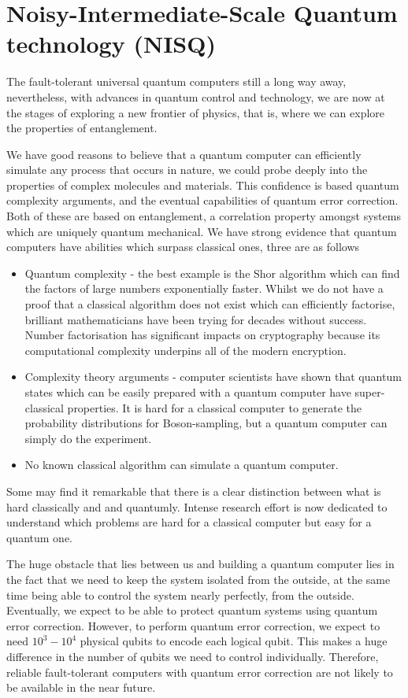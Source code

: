 \section{Noisy-Intermediate-Scale Quantum technology (NISQ)}

The fault-tolerant universal quantum computers still a long way away, nevertheless, 
with advances in quantum control and technology,
we are now at the stages of exploring a new frontier of physics, that is, where we can
explore the properties of entanglement.

We have good reasons to believe that a quantum computer can efficiently simulate any process that occurs in nature, we could probe deeply into the properties of complex molecules and materials. This confidence is based quantum complexity arguments, and the eventual capabilities of quantum error correction. Both of these are based on entanglement, a correlation property amongst systems which are uniquely quantum mechanical. We have strong evidence that quantum computers have abilities which surpass classical ones, three are as follows
\begin{itemize}
\item Quantum complexity - the best example is the Shor algorithm \cite{shor1994algorithms} which can find the factors of large numbers exponentially faster. Whilst we do not have a proof that a classical algorithm does not exist which can efficiently factorise, brilliant mathematicians have been trying for decades without success. Number factorisation has significant impacts on cryptography because its computational complexity underpins all of the modern encryption. 
% 
\item Complexity theory arguments - computer scientists have shown that quantum states which can be easily prepared with a quantum computer have super-classical properties. It is hard for a classical computer to generate the probability distributions for Boson-sampling, but a quantum computer can simply do the experiment.
% 
\item No known classical algorithm can simulate a quantum computer.
\end{itemize}

Some may find it remarkable that there is a clear distinction between what is hard classically and and quantumly. Intense research effort is now dedicated to understand which problems are hard for a classical computer but easy for a quantum one.


The huge obstacle that lies between us and building a quantum computer lies in the fact that we need to keep the system isolated from the outside, at the same time being able to control the system nearly perfectly, from the outside. Eventually, we expect to be able to protect quantum systems using quantum error correction. However, to perform quantum error correction, we expect to need $10^3 - 10^4$ physical qubits to encode each logical qubit. This makes a huge difference in the number of qubits we need to control individually. Therefore, reliable fault-tolerant computers with quantum error correction are not likely to be available in the near future.




